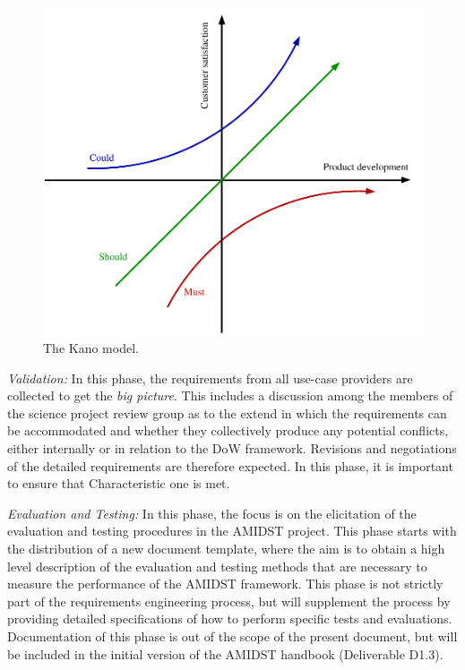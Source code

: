 \begin{figure}[htbp]
  \centering
  \includegraphics[width=0.75\linewidth]{kano}
  \caption{The Kano model.}
  \label{fig:kano}
\end{figure}


\emph{Validation:} In this phase, the requirements from all use-case providers are collected to get the \emph{big
  picture}.  This includes a discussion among the members of the science project review group as to the extend in which the
requirements can be accommodated and whether they collectively produce any potential conflicts, either internally or in
relation to the
DoW framework. Revisions and negotiations of the detailed requirements are therefore expected.  In this phase, it is important to ensure that Characteristic one is met.

 \emph{Evaluation and Testing:} In this phase, the focus is on the elicitation of the evaluation and testing procedures
 in the AMIDST project. This phase starts with the distribution of a new document template, where the aim is to obtain a
 high level description of the evaluation and testing methods that are necessary to measure the performance of the AMIDST
 framework. This phase is not strictly part of the requirements engineering process, but will supplement the process by providing
 detailed specifications of how to perform specific tests and evaluations. Documentation of this phase is out of the scope of the present document, but will
 be included in the initial version of the AMIDST handbook (Deliverable D1.3).    


